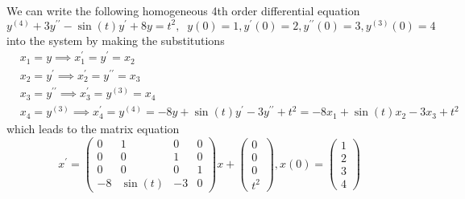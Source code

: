 \documentclass{article}
\newcounter{example}[section]
\begin{document}
      \begin{example}
        \label{ex:4th-order-deq-into-system-of-1st-order-deqs-in}
      We can write the following homogeneous 4th order differential equation 
      \begin{equation}
        y^{(4)} + 3 y^{\prime\prime} - \sin{(t)} y^\prime + 8y = t^2, \;\; y(0) = 1, y^\prime (0) = 2, y^{\prime\prime} (0) = 3, y^{(3)} (0) = 4
      \end{equation}
      into the system by making the substitutions 
      \begin{align*}
          & x_1 = y \implies x_1^\prime = y^\prime = x_2 \\
          & x_2 = y^\prime \implies x_2^\prime = y^{\prime\prime} = x_3 \\
          & x_3 = y^{\prime\prime} \implies x_3^\prime = y^{(3)} = x_4 \\
          & x_4 = y^{(3)} \implies x_4^\prime = y^{(4)} = -8y + \sin{(t)} y^\prime - 3y^{\prime\prime} + t^2 = -8x_1 + \sin{(t)} x_2 - 3x_3 + t^2
      \end{align*}
      which leads to the matrix equation
      \begin{equation}
        x^\prime =  \begin{pmatrix}
              0&1&0&0\\
              0&0&1&0\\
              0&0&0&1\\
              -8&\sin(t)&-3&0
              \end{pmatrix} x
              + \begin{pmatrix}
              0\\0\\0\\t^2
              \end{pmatrix}, x (0) = \begin{pmatrix}
              1\\2\\3\\4
              \end{pmatrix}
      \end{equation}
      \end{example}
\end{document}

